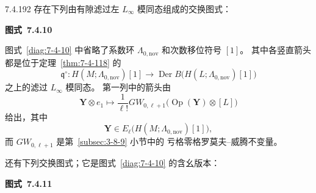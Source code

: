 \begin{theorem}{7.4.192}\label{thm:7-4-192}
存在下列由有隙滤过左 $L_\infty$ 模同态组成的交换图式：

\par\medskip\noindent\begin{minipage}{\textwidth}
\centering
{}
\par\smallskip
{\renewcommand{\thefigure}{7.4.10}
\normalfont\bfseries 图式~\thefigure\label{diag:7-4-10}}
\end{minipage}\par\medskip

图式~\ref{diag:7-4-10} 中省略了系数环
$\Lambda_{0,\mathrm{nov}}$ 和次数移位符号 $[1]$。
其中各竖直箭头都是位于定理~\ref{thm:7-4-118} 的
\[
\mathfrak q^\circ\colon
H(M;\Lambda_{0,\mathrm{nov}})[1]
\longrightarrow
\operatorname{Der}B
\bigl(H(L;\Lambda_{0,\mathrm{nov}})[1]\bigr)
\]
之上的滤过 $L_\infty$ 模同态。
第一列中的箭头由
\[
\mathbf Y\otimes e_1
\longmapsto
\frac1{\ell!}
GW_{0,\ell+1}
\bigl(\operatorname{Op}(\mathbf Y)\otimes[L]\bigr)
\]
给出，其中
\[
\mathbf Y\in
E_\ell\bigl(H(M;\Lambda_{0,\mathrm{nov}})[1]\bigr),
\]
而 $GW_{0,\ell+1}$ 是第~\ref{subsec:3-8-9} 小节中的
亏格零格罗莫夫--威腾不变量。

还有下列交换图式；它是图式~\ref{diag:7-4-10}
的含幺版本：

\par\medskip\noindent\begin{minipage}{\textwidth}
\centering
{}
\par\smallskip
{\renewcommand{\thefigure}{7.4.11}
\normalfont\bfseries 图式~\thefigure\label{diag:7-4-11}}
\end{minipage}\par\medskip


\end{theorem}
